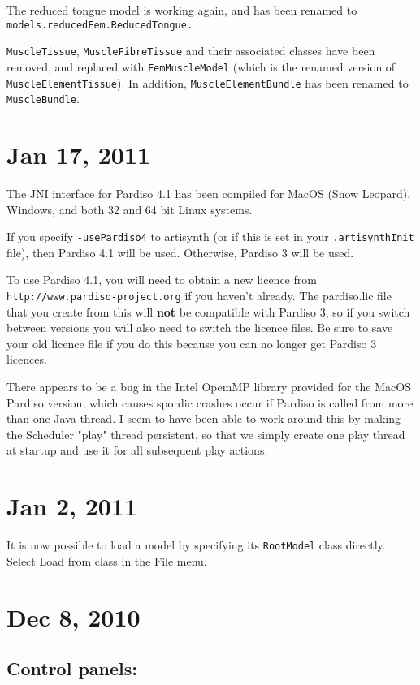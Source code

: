\documentclass{article}
\begin{document}
The reduced tongue model is working again, and has been renamed to
{\tt models.reducedFem.ReducedTongue.}

{\tt MuscleTissue}, {\tt MuscleFibreTissue} and their associated classes have
been removed, and replaced with {\tt FemMuscleModel} (which is the renamed
version of {\tt MuscleElementTissue}). In addition, {\tt MuscleElementBundle}
has been renamed to {\tt MuscleBundle}.

\section*{Jan 17, 2011}

The JNI interface for Pardiso 4.1 has been compiled for MacOS (Snow
Leopard), Windows, and both 32 and 64 bit Linux systems.
  
If you specify {\tt -usePardiso4} to artisynth (or if this is set in your
{\tt .artisynthInit} file), then Pardiso 4.1 will be used. Otherwise,
Pardiso 3 will be used.
  
To use Pardiso 4.1, you will need to obtain a new licence from
{\tt http://www.pardiso-project.org} if you haven't already. The pardiso.lic
file that you create from this will {\bf not} be compatible with Pardiso
3, so if you switch between versions you will also need to switch the
licence files. Be sure to save your old licence file if you do this
because you can no longer get Pardiso 3 licences.

There appears to be a bug in the Intel OpemMP library provided for the
MacOS Pardiso version, which causes spordic crashes occur if Pardiso
is called from more than one Java thread. I seem to have been able to
work around this by making the Scheduler "play" thread persistent, so
that we simply create one play thread at startup and use it for all
subsequent play actions.

\section*{Jan 2, 2011}

It is now possible to load a model by specifying its {\tt RootModel} class
directly. Select {\sf Load from class} in the {\sf File} menu.

\section*{Dec 8, 2010}

\subsection*{Control panels:}
\end{document}
